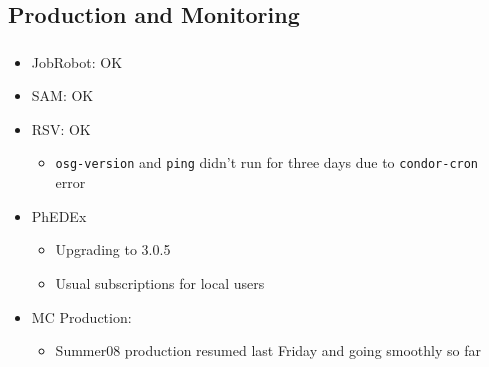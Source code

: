\documentclass{beamer}
\begin{document}
\subsection{Production and Monitoring}
\begin{frame}
\frametitle{}
\begin{itemize}
    \item JobRobot: OK
    \item SAM: OK
    \item RSV: OK
    \begin{itemize}
        \item {\tt osg-version} and {\tt ping} didn't run for three days due to {\tt condor-cron} error
    \end{itemize}
    \item PhEDEx
    \begin{itemize}
        \item Upgrading to 3.0.5
        \item Usual subscriptions for local users
    \end{itemize}
    \item MC Production:
    \begin{itemize}
        \item Summer08 production resumed last Friday and going smoothly so far
    \end{itemize}
\end{itemize}
\end{frame}
\end{document}
